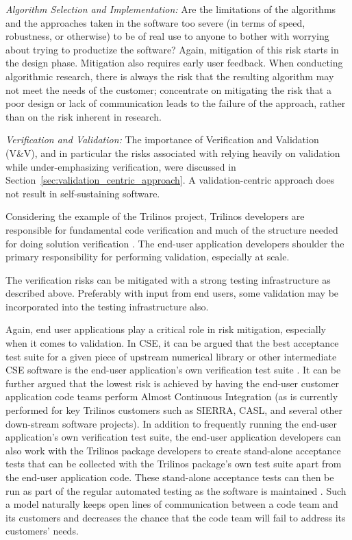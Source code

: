 \documentclass[11pt]{SANDreport}
\begin{document}
{}\textit{Algorithm Selection and Implementation:} Are the limitations
of the algorithms and the approaches taken in the software too severe
(in terms of speed, robustness, or otherwise) to be of real use to
anyone to bother with worrying about trying to productize the
software?  Again, mitigation of this risk starts in the design phase.
Mitigation also requires early user feedback.  When conducting
algorithmic research, there is always the risk that the resulting
algorithm may not meet the needs of the customer; concentrate on
mitigating the risk that a poor design or lack of communication leads
to the failure of the approach, rather than on the risk inherent in
research.

{}\textit{Verification and Validation:} The importance of Verification
and Validation (V\&V), and in particular the risks associated with
relying heavily on validation while under-emphasizing verification,
were discussed in Section~\ref{sec:validation_centric_approach}.  A
validation-centric approach does not result in self-sustaining
software.

Considering the example of the Trilinos project, Trilinos developers are
responsible for fundamental code verification and much of the
structure needed for doing solution verification
{}\cite{SEVVIntersections05}.  The end-user application
developers shoulder the primary responsibility for performing validation,
especially at scale.

The verification risks can be mitigated with a strong testing
infrastructure as described above.  Preferably with input from end
users, some validation may be incorporated into the testing
infrastructure also.

Again, end user applications play a critical role in risk mitigation,
especially when it comes to validation.  In CSE, it can be argued that
the best acceptance test suite for a given piece of upstream numerical
library or other intermediate CSE software is the end-user
application's own verification test suite
{}\cite{SoftwareIntegrationforCSE09}.  It can be further argued that
the lowest risk is achieved by having the end-user customer
application code teams perform Almost Continuous Integration
{}\cite{SoftwareIntegrationforCSE09} (as is currently performed for
key Trilinos customers such as SIERRA, CASL, and several other
down-stream software projects).  In addition to frequently running the
end-user application's own verification test suite, the end-user
application developers can also work with the Trilinos package
developers to create stand-alone acceptance tests that can be
collected with the Trilinos package's own test suite apart from the
end-user application code.  These stand-alone acceptance tests can
then be run as part of the regular automated testing as the software
is maintained {}\cite{DomainDrivenDesign}.  Such a model naturally
keeps open lines of communication between a code team and its
customers and decreases the chance that the code team will fail to
address its customers' needs.
\end{document}

